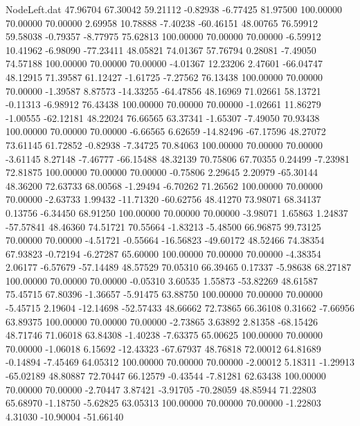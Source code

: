 \begin{filecontents}{NodeLeft.dat}
  47.96704   67.30042   59.21112    -0.82938   -6.77425   81.97500  100.00000   70.00000   70.00000    2.69958   10.78888   -7.40238  -60.46151
  48.00765   76.59912   59.58038    -0.79357   -8.77975   75.62813  100.00000   70.00000   70.00000   -6.59912   10.41962   -6.98090  -77.23411
  48.05821   74.01367   57.76794     0.28081   -7.49050   74.57188  100.00000   70.00000   70.00000   -4.01367   12.23206    2.47601  -66.04747
  48.12915   71.39587   61.12427    -1.61725   -7.27562   76.13438  100.00000   70.00000   70.00000   -1.39587    8.87573  -14.33255  -64.47856
  48.16969   71.02661   58.13721    -0.11313   -6.98912   76.43438  100.00000   70.00000   70.00000   -1.02661   11.86279   -1.00555  -62.12181
  48.22024   76.66565   63.37341    -1.65307   -7.49050   70.93438  100.00000   70.00000   70.00000   -6.66565    6.62659  -14.82496  -67.17596
  48.27072   73.61145   61.72852    -0.82938   -7.34725   70.84063  100.00000   70.00000   70.00000   -3.61145    8.27148   -7.46777  -66.15488
  48.32139   70.75806   67.70355     0.24499   -7.23981   72.81875  100.00000   70.00000   70.00000   -0.75806    2.29645    2.20979  -65.30144
  48.36200   72.63733   68.00568    -1.29494   -6.70262   71.26562  100.00000   70.00000   70.00000   -2.63733    1.99432  -11.71320  -60.62756
  48.41270   73.98071   68.34137     0.13756   -6.34450   68.91250  100.00000   70.00000   70.00000   -3.98071    1.65863    1.24837  -57.57841
  48.46360   74.51721   70.55664    -1.83213   -5.48500   66.96875   99.73125   70.00000   70.00000   -4.51721   -0.55664  -16.56823  -49.60172
  48.52466   74.38354   67.93823    -0.72194   -6.27287   65.60000  100.00000   70.00000   70.00000   -4.38354    2.06177   -6.57679  -57.14489
  48.57529   70.05310   66.39465     0.17337   -5.98638   68.27187  100.00000   70.00000   70.00000   -0.05310    3.60535    1.55873  -53.82269
  48.61587   75.45715   67.80396    -1.36657   -5.91475   63.88750  100.00000   70.00000   70.00000   -5.45715    2.19604  -12.14698  -52.57433
  48.66662   72.73865   66.36108     0.31662   -7.66956   63.89375  100.00000   70.00000   70.00000   -2.73865    3.63892    2.81358  -68.15426
  48.71746   71.06018   63.84308    -1.40238   -7.63375   65.00625  100.00000   70.00000   70.00000   -1.06018    6.15692  -12.43323  -67.67937
  48.76818   72.00012   64.81689    -0.14894   -7.45469   64.05312  100.00000   70.00000   70.00000   -2.00012    5.18311   -1.29913  -65.02189
  48.80887   72.70447   66.12579    -0.43544   -7.81281   62.63438  100.00000   70.00000   70.00000   -2.70447    3.87421   -3.91705  -70.28059
  48.85944   71.22803   65.68970    -1.18750   -5.62825   63.05313  100.00000   70.00000   70.00000   -1.22803    4.31030  -10.90004  -51.66140

\end{filecontents}
